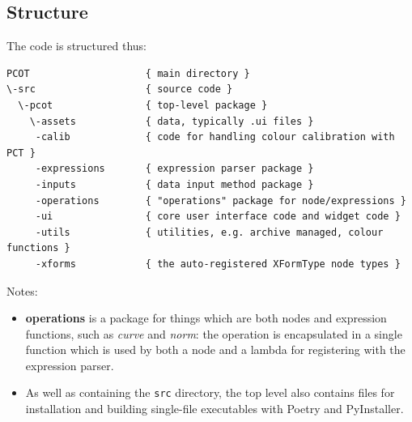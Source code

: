 \subsection{Structure}
The code is structured thus:
\begin{verbatim}
PCOT                    { main directory }
\-src                   { source code }
  \-pcot                { top-level package }
    \-assets            { data, typically .ui files }
     -calib             { code for handling colour calibration with PCT }
     -expressions       { expression parser package }
     -inputs            { data input method package }
     -operations        { "operations" package for node/expressions }
     -ui                { core user interface code and widget code }
     -utils             { utilities, e.g. archive managed, colour functions }
     -xforms            { the auto-registered XFormType node types }
\end{verbatim}
Notes:
\begin{itemize}
\item \textbf{operations} is a package for things which are both nodes and
expression functions, such as \emph{curve} and \emph{norm}: the operation
is encapsulated in a single function which is used by both a node
and a lambda for registering with the expression parser.
\item As well as containing the \texttt{src} directory, the top level
also contains files for installation and building single-file executables
with Poetry and PyInstaller.
\end{itemize}

